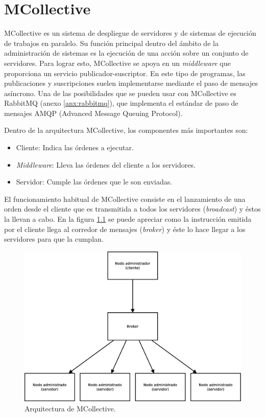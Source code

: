 \chapter{MCollective}
\label{anx:mcollective}


MCollective es un sistema de despliegue de servidores y de sistemas de ejecución de trabajos en paralelo. Su función principal dentro del ámbito de la administración de sistemas es la ejecución de una acción sobre un conjunto de servidores. Para lograr esto, MCollective se apoya en un \emph{middleware} que proporciona un servicio publicador-suscriptor. En este tipo de programas, las publicaciones y suscripciones suelen implementarse mediante el paso de mensajes asíncrono. Una de las posibilidades que se pueden usar con MCollective es RabbitMQ (anexo \ref{anx:rabbitmq}), que implementa el estándar de paso de mensajes AMQP (Advanced Message Queuing Protocol).

Dentro de la arquitectura MCollective, los componentes más importantes son:
\begin{itemize}
\item Cliente: Indica las órdenes a ejecutar.
\item \emph{Middleware}: Lleva las órdenes del cliente a los servidores.
\item Servidor: Cumple las órdenes que le son enviadas.
\end{itemize}

El funcionamiento habitual de MCollective consiste en el lanzamiento de una orden desde el cliente que es transmitida a todos los servidores (\emph{broadcast}) y éstos la llevan a cabo. En la figura \ref{figure:arquitectura-mcollective} se puede apreciar como la instrucción emitida por el cliente llega al corredor de mensajes (\emph{broker}) y éste lo hace llegar a los servidores para que la cumplan.

\begin{figure} [!htbp]
  \centering
  \includegraphics[width=13.5cm]{figuras/Arquitectura_MCollective.eps}
  \caption{Arquitectura de MCollective.}
\label{figure:arquitectura-mcollective}
\end{figure}

